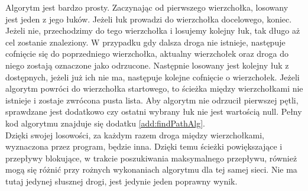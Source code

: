 Algorytm jest bardzo prosty. Zaczynając od pierwszego wierzchołka, losowany jest jeden z jego łuków. Jeżeli łuk prowadzi do wierzchołka docelowego, koniec. Jeżeli nie, przechodzimy do tego wierzchołka i losujemy kolejny łuk, tak długo aż cel zostanie znaleziony. W przypadku gdy dalsza droga nie istnieje, następuje cofnięcie się do poprzedniego wierzchołka, aktualny wierzchołek oraz droga do niego zostają oznaczone jako odrzucone. Następnie losowany jest kolejny łuk z dostępnych, jeżeli już ich nie ma, następuje kolejne cofnięcie o wierzchołek. Jeżeli algorytm powróci do wierzchołka startowego, to ścieżka między wierzchołkami nie istnieje i zostaje zwrócona pusta lista. Aby algorytm nie odrzucił pierwszej pętli, sprawdzane jest dodatkowo czy ostatni wybrany łuk nie jest wartością null. Pełny kod algorytmu znajduje się dodatku \ref{add:findPathAlg}.\\\indent 
Dzięki swojej losowości, za każdym razem droga między wierzchołkami, wyznaczona przez program, będzie inna. Dzięki temu ścieżki powiększające i przepływy blokujące, w trakcie poszukiwania maksymalnego przepływu, również mogą się różnić przy rożnych wykonaniach algorytmu dla tej samej sieci. Nie ma tutaj jedynej słusznej drogi, jest jedynie jeden poprawny wynik.

